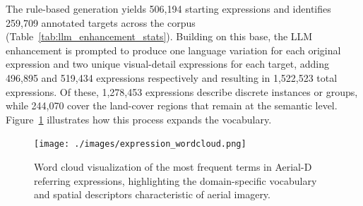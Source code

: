 \documentclass[journal]{IEEEtran}
\begin{document}
The rule-based generation yields 506,194 starting expressions and identifies 259,709 annotated targets across the corpus (Table~\ref{tab:llm_enhancement_stats}). Building on this base, the LLM enhancement is prompted to produce one language variation for each original expression and two unique visual-detail expressions for each target, adding 496,895 and 519,434 expressions respectively and resulting in 1,522,523 total expressions. Of these, 1,278,453 expressions describe discrete instances or groups, while 244,070 cover the land-cover regions that remain at the semantic level. Figure~\ref{fig:expression_wordcloud} illustrates how this process expands the vocabulary.

\begin{figure}[!t]
\centering
\texttt{[image: ./images/expression\_wordcloud.png]}
\caption{Word cloud visualization of the most frequent terms in Aerial-D referring expressions, highlighting the domain-specific vocabulary and spatial descriptors characteristic of aerial imagery.}
\label{fig:expression_wordcloud}
\end{figure}
\end{document}
